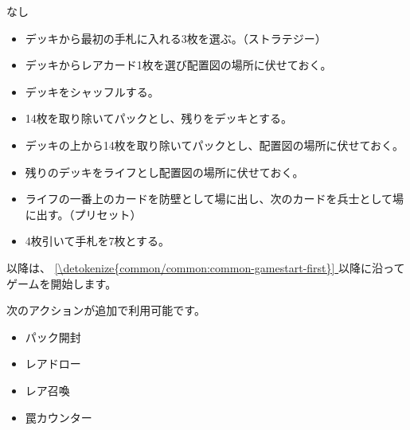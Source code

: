 \documentclass[letterpaper,10pt,dvipdfmx]{sphinxmanual}
\begin{document}
\sphinxAtStartPar
{}

\sphinxAtStartPar
なし

\sphinxAtStartPar
{}
\begin{itemize}
\item {} 
\sphinxAtStartPar
デッキから最初の手札に入れる3枚を選ぶ。（ストラテジー）

\item {} 
\sphinxAtStartPar
デッキからレアカード1枚を選び配置図の場所に伏せておく。

\item {} 
\sphinxAtStartPar
デッキをシャッフルする。

\item {} 
\sphinxAtStartPar
14枚を取り除いてパックとし、残りをデッキとする。

\item {} 
\sphinxAtStartPar
デッキの上から14枚を取り除いてパックとし、配置図の場所に伏せておく。

\item {} 
\sphinxAtStartPar
残りのデッキをライフとし配置図の場所に伏せておく。

\item {} 
\sphinxAtStartPar
ライフの一番上のカードを防壁として場に出し、次のカードを兵士として場に出す。（プリセット）

\item {} 
\sphinxAtStartPar
4枚引いて手札を7枚とする。

\end{itemize}

\sphinxAtStartPar
以降は、 \hyperref[\detokenize{common/common:common-gamestart-first}]{\ref{\detokenize{common/common:common-gamestart-first}} } 以降に沿ってゲームを開始します。

\sphinxAtStartPar
{}

\sphinxAtStartPar
次のアクションが追加で利用可能です。
\begin{itemize}
\item {} 
\sphinxAtStartPar
パック開封

\item {} 
\sphinxAtStartPar
レアドロー

\item {} 
\sphinxAtStartPar
レア召喚

\item {} 
\sphinxAtStartPar
罠カウンター

\end{itemize}
\end{document}
